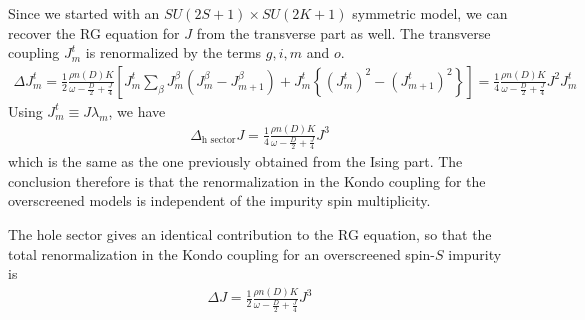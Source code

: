 \documentclass[12pt]{revtex4-2}
\begin{document}
Since we started with an \(SU(2S+1)\times SU(2K+1)\) symmetric model, we can recover the RG equation for \(J\) from the transverse part as well. The transverse coupling \(J^t_m\) is renormalized by the terms \(g,i,m\) and \(o\).
\begin{equation}\begin{aligned}
	\Delta J^t_m = \frac{1}{2}\frac{\rho n(D) K}{\omega - \frac{D}{2} + \frac{J}{4}}\left[J^t_m\sum_\beta J^\beta_m\left(J^\beta_m - J^\beta_{m+1}\right) + J^t_m \left\{ \left( J^t_m \right) ^2 - \left( J^t_{m+1} \right) ^2 \right\} \right] = \frac{1}{4}\frac{\rho n(D) K}{\omega - \frac{D}{2} + \frac{J}{4}} J^2 J^t_m
\end{aligned}\end{equation}
Using \(J^t_m \equiv J\lambda_m\), we have
\begin{equation}\begin{aligned}
	\Delta_\text{h sector} J = \frac{1}{4}\frac{\rho n(D) K}{\omega - \frac{D}{2} + \frac{J}{4}} J^3
\end{aligned}\end{equation}
which is the same as the one previously obtained from the Ising part. The conclusion therefore is that the renormalization in the Kondo coupling for the overscreened models is independent of the impurity spin multiplicity.

The hole sector gives an identical contribution to the RG equation, so that the total renormalization in the Kondo coupling for an overscreened spin-\(S\) impurity is
\begin{equation}\begin{aligned}
	\Delta J = \frac{1}{2}\frac{\rho n(D) K}{\omega - \frac{D}{2} + \frac{J}{4}} J^3
\end{aligned}\end{equation}
\end{document}
